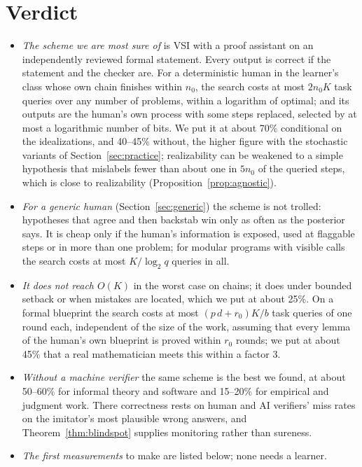 \documentclass[11pt]{article}
\theoremstyle{definition}
\theoremstyle{remark}
\newcommand{\K}{K}
\begin{document}
\section{Verdict}\label{sec:verdict}
\begin{itemize}[nosep]
\item \emph{The scheme we are most sure of} is VSI with a proof assistant on an independently reviewed formal statement. Every output is correct if the statement and the checker are. For a deterministic human in the learner's class whose own chain finishes within $n_0$, the search costs at most $2n_0\K$ task queries over any number of problems, within a logarithm of optimal; and its outputs are the human's own process with some steps replaced, selected by at most a logarithmic number of bits. We put it at about 70\% conditional on the idealizations, and 40--45\% without, the higher figure with the stochastic variants of Section~\ref{sec:practice}; realizability can be weakened to a simple hypothesis that mislabels fewer than about one in $5n_0$ of the queried steps, which is close to realizability (Proposition~\ref{prop:agnostic}).
\item \emph{For a generic human} (Section~\ref{sec:generic}) the scheme is not trolled: hypotheses that agree and then backstab win only as often as the posterior says. It is cheap only if the human's information is exposed, used at flaggable steps or in more than one problem; for modular programs with visible calls the search costs at most $\K/\log_2q$ queries in all.
\item \emph{It does not reach $O(\K)$} in the worst case on chains; it does under bounded setback or when mistakes are located, which we put at about 25\%. On a formal blueprint the search costs at most $(p\,d+r_0)\K/b$ task queries of one round each, independent of the size of the work, assuming that every lemma of the human's own blueprint is proved within $r_0$ rounds; we put at about 45\% that a real mathematician meets this within a factor 3.
\item \emph{Without a machine verifier} the same scheme is the best we found, at about 50--60\% for informal theory and software and 15--20\% for empirical and judgment work. There correctness rests on human and AI verifiers' miss rates on the imitator's most plausible wrong answers, and Theorem~\ref{thm:blindspot} supplies monitoring rather than sureness.
\item \emph{The first measurements} to make are listed below; none needs a learner.
\end{itemize}
\end{document}
